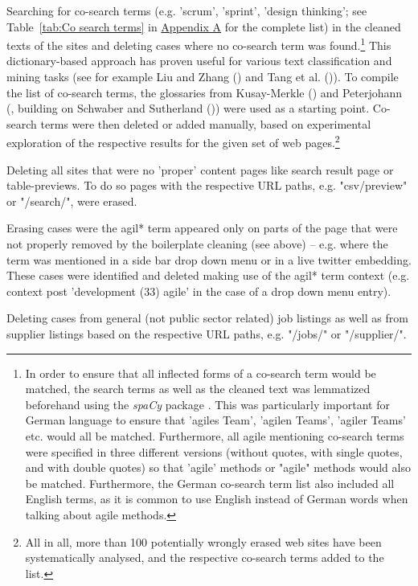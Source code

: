 \begin{compactitem}
\begin{compactitem}
    \item Searching for co-search terms (e.g. 'scrum', 'sprint', 'design thinking'; see Table~\ref{tab:Co search terms} in \hyperref[Appendix A]{Appendix A} for the complete list) in the cleaned texts of the sites and deleting cases where no co-search term was found.\footnote{In order to ensure that all inflected forms of a co-search term would be matched, the search terms as well as the cleaned text was lemmatized beforehand using the \textit{spaCy} package \parencite{honnibal-johnson:2015:EMNLP}. This was particularly important for German language to ensure that 'agiles Team', 'agilen Teams', 'agiler Teams' etc. would all be matched. Furthermore, all agile mentioning co-search terms were specified in three different versions (without quotes, with single quotes, and with double quotes) so that 'agile' methods or "agile" methods would also be matched. Furthermore, the German co-search term list also included all English terms, as it is common to use English instead of German words when talking about agile methods.} This dictionary-based approach has proven useful for various text classification and mining tasks (see for example Liu and Zhang (\cite*{Liu2012}) and  Tang et al. (\cite*{TANG2013})). To compile the list of co-search terms, the glossaries from Kusay-Merkle (\cite*{Kusay-Merkle2018}) and Peterjohann (\cite*{Peterjohann2020}, building on Schwaber  and  Sutherland (\cite*{Schwaber2020})) were used as a starting point. Co-search terms were then deleted or added manually, based on experimental exploration of the respective results for the given set of web pages.\footnote{All in all, more than 100 potentially wrongly erased web sites have been systematically analysed, and the respective co-search terms added to the list.} 
    \item Deleting all sites that were no 'proper' content pages like search result page or table-previews. To do so pages with the respective URL paths, e.g. "csv/preview" or "/search/", were erased.
    \item Erasing cases were the agil* term appeared only on parts of the page that were not properly removed by the boilerplate cleaning (see above) – e.g. where the term was mentioned in a side bar drop down menu or in a live twitter embedding. These cases were identified and deleted making use of the agil* term context (e.g. context post 'development (33) agile' in the case of a drop down menu entry).
    \item Deleting cases from general (not public sector related) job listings as well as from supplier listings based on the respective URL paths, e.g. "/jobs/" or "/supplier/".

\end{compactitem}
\end{compactitem}
